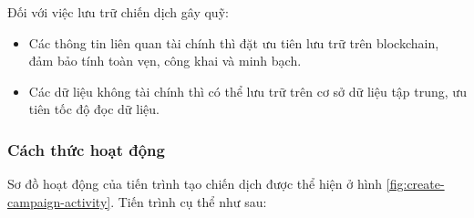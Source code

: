\documentclass[../main-report.tex]{subfiles}
\begin{document}
Đối với việc lưu trữ chiến dịch gây quỹ:

\begin{itemize}
\item Các thông tin liên quan tài chính thì đặt ưu tiên lưu trữ trên \gls{blockchain}, đảm bảo tính toàn vẹn, công khai và minh bạch.
\item Các dữ liệu không tài chính thì có thể lưu trữ trên cơ sở dữ liệu tập trung, ưu tiên tốc độ đọc dữ liệu.
\end{itemize}
\subsubsection{Cách thức hoạt động}
Sơ đồ hoạt động của tiến trình tạo chiến dịch được thể hiện ở hình \ref{fig:create-campaign-activity}. Tiến trình cụ thể như sau:
\end{document}

